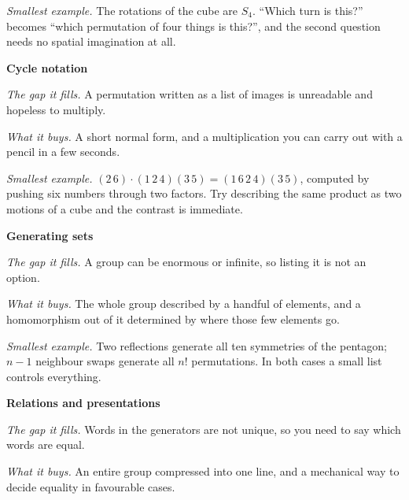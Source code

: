 \documentclass[10pt]{article}
\begin{document}
{\begin{minipage}[t]{744pt}
\begin{minipage}[t]{238pt}
\emph{Smallest example.} The rotations of the cube are $S_4$. ``Which turn is this?'' becomes ``which permutation of four things is this?'', and the second question needs no spatial imagination at all.
\end{minipage}\hfill
\begin{minipage}[t]{238pt}\vspace{0pt}
{\sffamily\bfseries\color{big} Cycle notation}\par\vspace{1pt}
\emph{The gap it fills.} A permutation written as a list of images is unreadable and hopeless to multiply.\par\vspace{1pt}
\emph{What it buys.} A short normal form, and a multiplication you can carry out with a pencil in a few seconds.\par\vspace{1pt}
\emph{Smallest example.} $(2\,6)\cdot(1\,2\,4)(3\,5)=(1\,6\,2\,4)(3\,5)$, computed by pushing six numbers through two factors. Try describing the same product as two motions of a cube and the contrast is immediate.\par\vspace{5pt}
{\sffamily\bfseries\color{big} Generating sets}\par\vspace{1pt}
\emph{The gap it fills.} A group can be enormous or infinite, so listing it is not an option.\par\vspace{1pt}
\emph{What it buys.} The whole group described by a handful of elements, and a homomorphism out of it determined by where those few elements go.\par\vspace{1pt}
\emph{Smallest example.} Two reflections generate all ten symmetries of the pentagon; $n-1$ neighbour swaps generate all $n!$ permutations. In both cases a small list controls everything.\par\vspace{5pt}
{\sffamily\bfseries\color{big} Relations and presentations}\par\vspace{1pt}
\emph{The gap it fills.} Words in the generators are not unique, so you need to say which words are equal.\par\vspace{1pt}
\emph{What it buys.} An entire group compressed into one line, and a mechanical way to decide equality in favourable cases.\par\vspace{1pt}

\end{minipage}
\end{minipage}}
\end{document}

